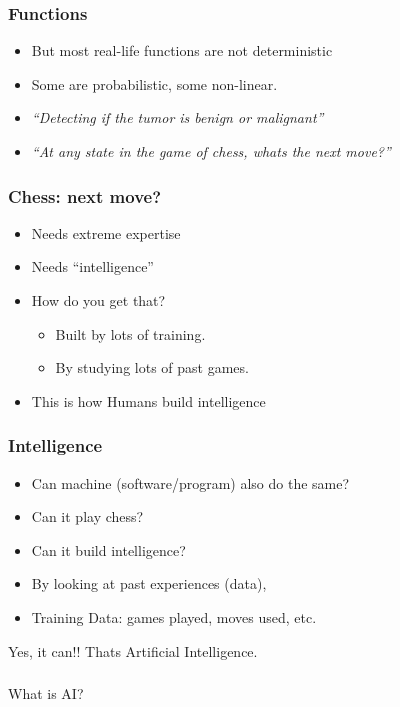 \begin{frame}[fragile]\frametitle{Functions}
\begin{itemize}
\item But most real-life functions are not deterministic
\item Some are probabilistic, some non-linear.
\item {\em ``Detecting if the tumor is benign or malignant''}
\item {\em ``At any state in the game of chess, whats the next move?''}
\end{itemize}
\end{frame}

\begin{frame}[fragile]\frametitle{Chess: next move?}
\begin{itemize}
\item Needs extreme expertise
\item Needs ``intelligence''
\item How do you get that?
\begin{itemize}
\item Built by lots of training.
\item By studying lots of past games.
\end{itemize}
\item This is how Humans build intelligence
\end{itemize}
\end{frame}

\begin{frame}[fragile]\frametitle{Intelligence}
\begin{itemize}
\item Can machine (software/program) also do the same?
\item Can it play chess?
\item Can it build intelligence?
\item By looking at past experiences (data), 
\item Training Data: games played, moves used, etc.
\end{itemize}
Yes, it can!! Thats Artificial Intelligence.
\end{frame}

\begin{frame}[fragile]\frametitle{}
\begin{center}
{\Large What is AI?}
\end{center}
\end{frame}



